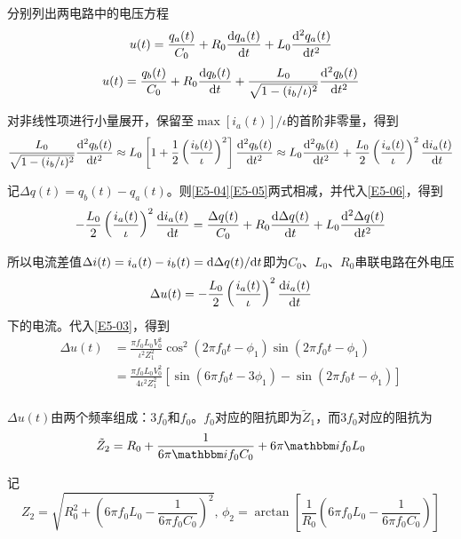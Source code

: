 \documentclass[10pt,a4paper,onecolumn,UTF8]{ctexart}
\begin{document}
	分别列出两电路中的电压方程
	\begin{equation}\label{E5-04}
		u(t)=\frac{q_a(t)}{C_0}+R_0\frac{\mathrm{d} q_a(t)}{\mathrm{d} t}+L_0\frac{\mathrm{d}^2 q_a(t)}{\mathrm{d} t^2}
	\end{equation}
	\begin{equation}\label{E5-05}
		u(t)=\frac{q_b(t)}{C_0}+R_0\frac{\mathrm{d} q_b(t)}{\mathrm{d} t}+\frac{L_0}{\sqrt{1-(i_{b}/\iota)^2}}\frac{\mathrm{d}^2 q_b(t)}{\mathrm{d} t^2}
	\end{equation}
	
	对非线性项进行小量展开，保留至$\max[i_a(t)]/\iota$的首阶非零量，得到
	\begin{equation}\label{E5-06}
		\frac{L_0}{\sqrt{1-(i_{b}/\iota)^2}}\frac{\mathrm{d}^2 q_b(t)}{\mathrm{d} t^2}\approx L_0\left[1+\frac{1}{2}\left(\frac{i_b(t)}{\iota}\right)^2\right]\frac{\mathrm{d}^2 q_b(t)}{\mathrm{d} t^2}\approx L_0\frac{\mathrm{d}^2 q_b(t)}{\mathrm{d} t^2}+\frac{L_0}{2}\left(\frac{i_a(t)}{\iota}\right)^2\frac{\mathrm{d} i_a(t)}{\mathrm{d} t}
	\end{equation}
	
	记$\Delta q(t)=q_b(t)-q_a(t)$。则\eqref{E5-04}\eqref{E5-05}两式相减，并代入\eqref{E5-06}，得到
	\begin{equation}
		-\frac{L_0}{2}\left(\frac{i_a(t)}{\iota}\right)^2\frac{\mathrm{d} i_a(t)}{\mathrm{d} t}=\frac{\Delta q(t)}{C_0}+R_0\frac{\mathrm{d}\Delta q(t)}{\mathrm{d} t}+L_0\frac{\mathrm{d}^2\Delta q(t)}{\mathrm{d} t^2}
	\end{equation}
	
	所以电流差值$\Delta i(t)=i_a(t)-i_b(t)=\mathrm{d}\Delta q(t)/\mathrm{d} t$即为$C_0$、$L_0$、$R_0$串联电路在外电压
	$$
		\Delta u(t)=-\frac{L_0}{2}\left(\frac{i_a(t)}{\iota}\right)^2\frac{\mathrm{d} i_{a}(t)}{\mathrm{d} t}
	$$
	下的电流。代入\eqref{E5-03}，得到
	\begin{equation}
		\begin{aligned}
			\Delta u(t)&=\frac{\pi f_0L_0V_0^2}{\iota^2Z_1^2}\cos^2(2\pi f_0t-\phi_1)\sin(2\pi f_0t-\phi_1)\\
			&=\frac{\pi f_0L_0V_0^2}{4\iota^2Z_1^2}\left[\sin(6\pi f_0t-3\phi_1)-\sin(2\pi f_0t-\phi_1)\right]\\
		\end{aligned}
	\end{equation}
	
	$\Delta u(t)$由两个频率组成：$3f_0$和$f_0$。$f_0$对应的阻抗即为$\tilde{Z}_1$，而$3f_0$对应的阻抗为
	\begin{equation}
		\tilde{Z}_2=R_0+\frac{1}{6\pi\ui f_0C_0}+6\pi\ui f_0L_0
	\end{equation}
	
	记
	$$Z_2=\sqrt{R_0^2+\left(6\pi f_0L_0-\frac{1}{6\pi f_0C_0}\right)^2},\,\phi_2=\arctan\left[\frac{1}{R_0}\left(6\pi f_0L_0-\frac{1}{6\pi f_0C_0}\right)\right]$$
	
\end{document}
